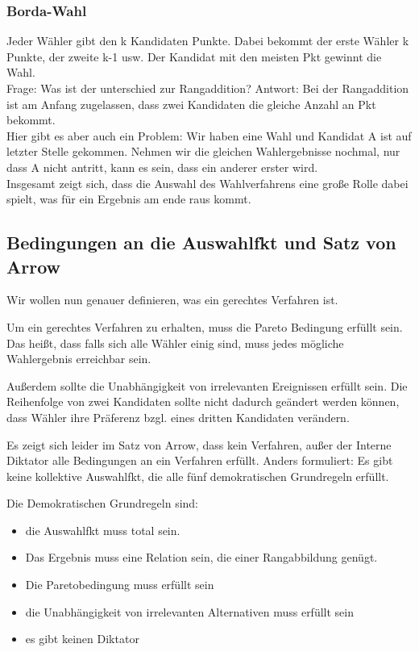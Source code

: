 \documentclass[]{article}
\begin{document}
\subsubsection*{Borda-Wahl}
Jeder Wähler gibt den k Kandidaten Punkte. Dabei bekommt der erste Wähler k Punkte, der zweite k-1 usw. Der Kandidat mit den meisten Pkt gewinnt die Wahl. \\

Frage: Was ist der unterschied zur Rangaddition? 
Antwort: Bei der Rangaddition ist am Anfang zugelassen, dass zwei Kandidaten die gleiche Anzahl an Pkt bekommt.  \\

Hier gibt es aber auch ein Problem: Wir haben eine Wahl und Kandidat A ist auf letzter Stelle gekommen. Nehmen wir die gleichen Wahlergebnisse nochmal, nur dass A nicht antritt, kann es sein, dass ein anderer erster wird. \\

Insgesamt zeigt sich, dass die Auswahl des Wahlverfahrens eine große Rolle dabei spielt, was für ein Ergebnis am ende raus kommt. 

\subsection{Bedingungen an die Auswahlfkt und Satz von Arrow}

Wir wollen nun genauer definieren, was ein gerechtes Verfahren ist.  

Um ein gerechtes Verfahren zu erhalten, muss die Pareto Bedingung erfüllt sein. Das heißt, dass falls sich alle Wähler einig sind, muss jedes mögliche Wahlergebnis erreichbar sein.

Außerdem sollte die Unabhängigkeit von irrelevanten Ereignissen erfüllt sein. Die Reihenfolge von zwei Kandidaten sollte nicht dadurch geändert werden können, dass Wähler ihre Präferenz bzgl. eines dritten Kandidaten verändern. 

Es zeigt sich leider im Satz von Arrow, dass kein Verfahren, außer der Interne Diktator alle Bedingungen an ein Verfahren erfüllt. Anders formuliert: Es gibt keine kollektive Auswahlfkt, die alle fünf demokratischen Grundregeln erfüllt.

Die Demokratischen Grundregeln sind:

\begin{itemize}
 \item die Auswahlfkt muss total sein.
 \item Das Ergebnis muss eine Relation sein, die einer Rangabbildung genügt.
 \item Die Paretobedingung muss erfüllt sein
 \item die Unabhängigkeit von irrelevanten Alternativen muss erfüllt sein
 \item es gibt keinen Diktator
\end{itemize}
\end{document}

